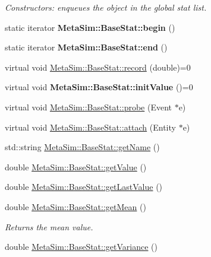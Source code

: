 \begin{DoxyCompactItemize}
\begin{DoxyCompactList}\small\item\em Constructors\+: enqueues the object in the global stat list. \end{DoxyCompactList}\item 
static iterator {\bfseries Meta\+Sim\+::\+Base\+Stat\+::begin} ()\hypertarget{group__metasim__stat_gab986c66cdb2b2e4598bae685c6ec566f}{}\label{group__metasim__stat_gab986c66cdb2b2e4598bae685c6ec566f}

\item 
static iterator {\bfseries Meta\+Sim\+::\+Base\+Stat\+::end} ()\hypertarget{group__metasim__stat_ga5f328eb5ff98ff412da8894e2cb9c90e}{}\label{group__metasim__stat_ga5f328eb5ff98ff412da8894e2cb9c90e}

\item 
virtual void \hyperlink{group__metasim__stat_gabf9c73112c72defa99961982da53fb71}{Meta\+Sim\+::\+Base\+Stat\+::record} (double)=0
\item 
virtual void {\bfseries Meta\+Sim\+::\+Base\+Stat\+::init\+Value} ()=0\hypertarget{group__metasim__stat_ga8ada3862dd1e9d622bb3dce50f8c3227}{}\label{group__metasim__stat_ga8ada3862dd1e9d622bb3dce50f8c3227}

\item 
virtual void \hyperlink{group__metasim__stat_ga26159e56ee45dc6d8e1413bf7e54ecbe}{Meta\+Sim\+::\+Base\+Stat\+::probe} (Event $\ast$e)
\item 
virtual void \hyperlink{group__metasim__stat_gaf5584d4aefc280eb644997fd13f8cd3d}{Meta\+Sim\+::\+Base\+Stat\+::attach} (Entity $\ast$e)
\item 
std\+::string \hyperlink{group__metasim__stat_ga4aa54dc810a8178ce3c1bcd13e3f1f00}{Meta\+Sim\+::\+Base\+Stat\+::get\+Name} ()
\item 
double \hyperlink{group__metasim__stat_ga1c038c3cad17287ae59680a62e1301a9}{Meta\+Sim\+::\+Base\+Stat\+::get\+Value} ()
\item 
double \hyperlink{group__metasim__stat_ga44f5a2cda5f88cf941c1cedbc40c3e19}{Meta\+Sim\+::\+Base\+Stat\+::get\+Last\+Value} ()
\item 
double \hyperlink{group__metasim__stat_ga3300f3a76af416db83cff8d67ace7561}{Meta\+Sim\+::\+Base\+Stat\+::get\+Mean} ()\hypertarget{group__metasim__stat_ga3300f3a76af416db83cff8d67ace7561}{}\label{group__metasim__stat_ga3300f3a76af416db83cff8d67ace7561}

\begin{DoxyCompactList}\small\item\em Returns the mean value. \end{DoxyCompactList}\item 
double \hyperlink{group__metasim__stat_gad2e53ad4a56f37c4d400f3932e9d4671}{Meta\+Sim\+::\+Base\+Stat\+::get\+Variance} ()\hypertarget{group__metasim__stat_gad2e53ad4a56f37c4d400f3932e9d4671}{}\label{group__metasim__stat_gad2e53ad4a56f37c4d400f3932e9d4671}


\end{DoxyCompactItemize}
